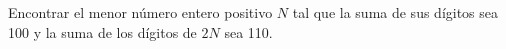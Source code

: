 Encontrar el menor número entero positivo $ N$ tal que la suma de sus dígitos sea 100 y la suma de los dígitos de $ 2N$ sea 110.
